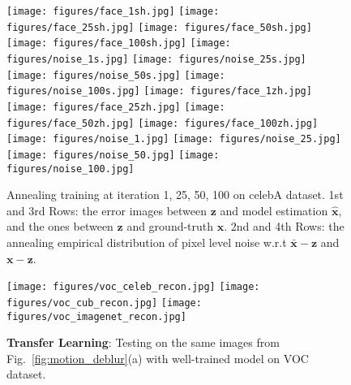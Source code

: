 \documentclass[10pt,twocolumn,letterpaper]{article}
\begin{document}
\begin{figure}
\centering
\texttt{[image: figures/face\_1sh.jpg]}
\texttt{[image: figures/face\_25sh.jpg]}
\texttt{[image: figures/face\_50sh.jpg]}
\texttt{[image: figures/face\_100sh.jpg]}
\texttt{[image: figures/noise\_1s.jpg]}
\texttt{[image: figures/noise\_25s.jpg]}
\texttt{[image: figures/noise\_50s.jpg]}
\texttt{[image: figures/noise\_100s.jpg]}
\texttt{[image: figures/face\_1zh.jpg]}
\texttt{[image: figures/face\_25zh.jpg]}
\texttt{[image: figures/face\_50zh.jpg]}
\texttt{[image: figures/face\_100zh.jpg]}
\texttt{[image: figures/noise\_1.jpg]}
\texttt{[image: figures/noise\_25.jpg]}
\texttt{[image: figures/noise\_50.jpg]}
\texttt{[image: figures/noise\_100.jpg]}
\caption{Annealing training at iteration 1, 25, 50, 100 on celebA dataset. 1st and 3rd Rows: the error images between $\mathbf{z}$ and model estimation $\hat{\mathbf{x}}$, and the ones between $\mathbf{z}$ and ground-truth $\mathbf{x}$. 2nd and 4th Rows: the annealing empirical distribution of pixel level noise w.r.t $\bar{\mathbf{x}}-\mathbf{z}$ and $\mathbf{x}-\mathbf{z}$.}
\label{fig:anneal}
\end{figure}

\begin{figure}
\centering
\texttt{[image: figures/voc\_celeb\_recon.jpg]}
\texttt{[image: figures/voc\_cub\_recon.jpg]}
\texttt{[image: figures/voc\_imagenet\_recon.jpg]}
\caption{\textbf{Transfer Learning}: Testing on the same images from Fig.~\ref{fig:motion_deblur}(a) with well-trained model on VOC dataset.}
\label{fig:adaption}
\end{figure}
\end{document}
